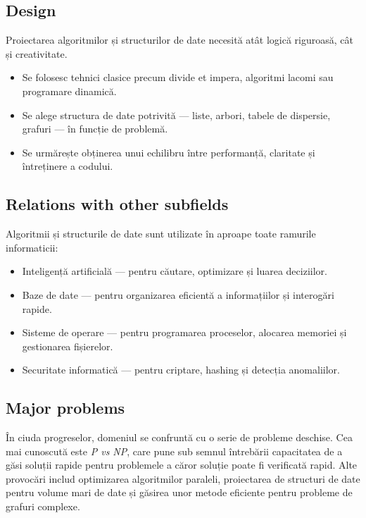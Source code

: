 \documentclass[12pt, letterpaper]{article}
\begin{document}
\subsection*{Design}
Proiectarea algoritmilor și structurilor de date necesită atât logică riguroasă, cât și creativitate.
\begin{itemize}
    \item Se folosesc tehnici clasice precum divide et impera, algoritmi lacomi sau programare dinamică.
    \item Se alege structura de date potrivită — liste, arbori, tabele de dispersie, grafuri — în funcție de problemă.
    \item Se urmărește obținerea unui echilibru între performanță, claritate și întreținere a codului.
\end{itemize}

\subsection*{Relations with other subfields}
Algoritmii și structurile de date sunt utilizate în aproape toate ramurile informaticii:
\begin{itemize}
    \item Inteligență artificială — pentru căutare, optimizare și luarea deciziilor.
    \item Baze de date — pentru organizarea eficientă a informațiilor și interogări rapide.
    \item Sisteme de operare — pentru programarea proceselor, alocarea memoriei și gestionarea fișierelor.
    \item Securitate informatică — pentru criptare, hashing și detecția anomaliilor.
\end{itemize}

\subsection*{Major problems}
În ciuda progreselor, domeniul se confruntă cu o serie de probleme deschise. Cea mai cunoscută este \textit{P vs NP}, care pune sub semnul întrebării capacitatea de a găsi soluții rapide pentru problemele a căror soluție poate fi verificată rapid. Alte provocări includ optimizarea algoritmilor paraleli, proiectarea de structuri de date pentru volume mari de date și găsirea unor metode eficiente pentru probleme de grafuri complexe.
\end{document}
